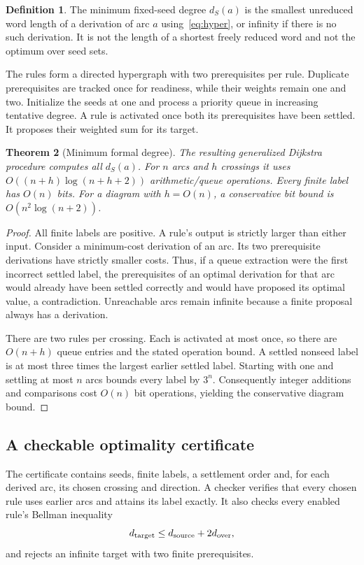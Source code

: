 \documentclass[11pt]{article}
\newtheorem{theorem}{Theorem}[section]
\theoremstyle{definition}
\newtheorem{definition}[theorem]{Definition}
\theoremstyle{remark}
\begin{document}
\begin{definition}
The minimum fixed-seed degree $d_S(a)$ is the smallest unreduced word length of a derivation of arc $a$ using~\eqref{eq:hyper}, or infinity if there is no such derivation. It is not the length of a shortest freely reduced word and not the optimum over seed sets.
\end{definition}

The rules form a directed hypergraph with two prerequisites per rule. Duplicate prerequisites are tracked once for readiness, while their weights remain one and two. Initialize the seeds at one and process a priority queue in increasing tentative degree. A rule is activated once both its prerequisites have been settled. It proposes their weighted sum for its target.

\begin{theorem}[Minimum formal degree]
\label{thm:dijkstra}
The resulting generalized Dijkstra procedure computes all $d_S(a)$. For $n$ arcs and $h$ crossings it uses $O((n+h)\log(n+h+2))$ arithmetic/queue operations. Every finite label has $O(n)$ bits. For a diagram with $h=O(n)$, a conservative bit bound is $O(n^2\log(n+2))$.
\end{theorem}
\begin{proof}
All finite labels are positive. A rule's output is strictly larger than either input. Consider a minimum-cost derivation of an arc. Its two prerequisite derivations have strictly smaller costs. Thus, if a queue extraction were the first incorrect settled label, the prerequisites of an optimal derivation for that arc would already have been settled correctly and would have proposed its optimal value, a contradiction. Unreachable arcs remain infinite because a finite proposal always has a derivation.

There are two rules per crossing. Each is activated at most once, so there are $O(n+h)$ queue entries and the stated operation bound. A settled nonseed label is at most three times the largest earlier settled label. Starting with one and settling at most $n$ arcs bounds every label by $3^n$. Consequently integer additions and comparisons cost $O(n)$ bit operations, yielding the conservative diagram bound.
\end{proof}

\subsection{A checkable optimality certificate}
The certificate contains seeds, finite labels, a settlement order and, for each derived arc, its chosen crossing and direction. A checker verifies that every chosen rule uses earlier arcs and attains its label exactly. It also checks every enabled rule's Bellman inequality
\[
d_{\rm target}\le d_{\rm source}+2d_{\rm over},
\]
and rejects an infinite target with two finite prerequisites.
\end{document}
